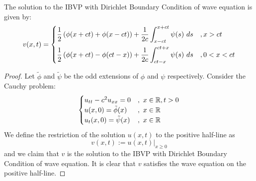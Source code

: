 \begin{lem}
    The solution to the IBVP with Dirichlet Boundary Condition of wave equation is given by:
    \[v(x,t) = \begin{dcases}
        \frac{1}{2}\left(\phi(x+ct) + \phi(x-ct)\right) + \frac{1}{2c} \int_{x-ct}^{x+ct} \psi(s)\ ds &, x > ct\\
        \frac{1}{2}\left(\phi(x+ct) - \phi(ct-x)\right) + \frac{1}{2c} \int_{ct-x}^{ct+x} \psi(s)\ ds &, 0< x < ct
    \end{dcases}\]
\end{lem}
\begin{proof}
    Let $\tilde{\phi}$ and $\tilde{\psi}$ be the odd extensions of $\phi$ and $\psi$ respectively. Consider the Cauchy problem:
    \[\begin{cases}
        u_{tt}-c^2u_{xx} = 0 &,\ x\in {\mathbb R}, t>0 \\
        u(x,0) = \tilde\phi(x) &,\ x\in {\mathbb R} \\
        u_t(x,0) = \tilde\psi(x) &,\ x\in {\mathbb R}
    \end{cases}\]
    We define the restriction of the solution $u(x,t)$ to the positive half-line as
    \[v(x,t):= u(x,t)\vert_{x\geq 0}\]
    and we claim that $v$ is the solution to the IBVP with Dirichlet Boundary Condition of wave equation. It is clear that $v$ satisfies the wave equation on the positive half-line.
    

\end{proof}
